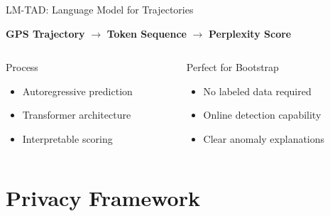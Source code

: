 \documentclass[aspectratio=169,xcolor={dvipsnames}]{beamer}
\begin{document}
\begin{frame}{LM-TAD: Language Model for Trajectories}
  \begin{block}{}
    \centering
    \Large \textbf{GPS Trajectory} $\rightarrow$ \textbf{Token Sequence} $\rightarrow$ \textbf{Perplexity Score}
    
    \vspace{0.5em}
    \small \cite{mbuyaTrajectoryAnomalyDetection2024}
  \end{block}
  
  \vspace{1em}
  \begin{columns}[T,onlytextwidth]
    \begin{column}{0.48\textwidth}
      \begin{block}{Process}
        \begin{itemize}
          \item Autoregressive prediction
          \item Transformer architecture
          \item Interpretable scoring
        \end{itemize}
      \end{block}
    \end{column}
    \hspace{0.04\textwidth}
    \begin{column}{0.48\textwidth}
      \begin{block}{Perfect for Bootstrap}
        \begin{itemize}
          \item No labeled data required
          \item Online detection capability
          \item Clear anomaly explanations
        \end{itemize}
      \end{block}
    \end{column}
  \end{columns}
\end{frame}

\section{Privacy Framework}
\end{document}
